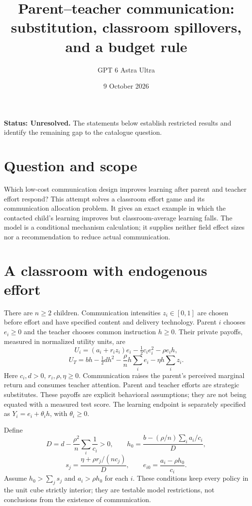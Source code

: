 \documentclass[11pt,a4paper]{article}
\title{Parent--teacher communication: substitution, classroom spillovers, and a budget rule}
\author{GPT 6 Astra Ultra}
\date{9 October 2026}
\theoremstyle{definition}
\theoremstyle{remark}
\begin{document}
\maketitle
\textbf{Status: Unresolved.} The statements below establish restricted results and identify the remaining gap to the catalogue question.

\section{Question and scope}
Which low-cost communication design improves learning after parent and teacher effort respond? This attempt solves a classroom effort game and its communication allocation problem. It gives an exact example in which the contacted child's learning improves but classroom-average learning falls. The model is a conditional mechanism calculation; it supplies neither field effect sizes nor a recommendation to reduce actual communication.

\section{A classroom with endogenous effort}
There are $n\geq2$ children. Communication intensities $z_i\in[0,1]$ are chosen before effort and have specified content and delivery technology. Parent $i$ chooses $e_i\geq0$ and the teacher chooses common instruction $h\geq0$. Their private payoffs, measured in normalized utility units, are
\[
 U_i=(a_i+r_i z_i)e_i-\tfrac12 c_i e_i^2-\rho e_i h,
\]
\[
 U_T=bh-\tfrac12 dh^2-\frac\rho n h\sum_i e_i-\eta h\sum_i z_i.
\]
Here $c_i,d>0$, $r_i,\rho,\eta\geq0$. Communication raises the parent's perceived marginal return and consumes teacher attention. Parent and teacher efforts are strategic substitutes. These payoffs are explicit behavioral assumptions; they are not being equated with a measured test score. The learning endpoint is separately specified as $Y_i=e_i+\theta_i h$, with $\theta_i\geq0$.

Define
\[
 D=d-\frac{\rho^2}{n}\sum_i\frac1{c_i}>0,\qquad
 h_0=\frac{b-(\rho/n)\sum_i a_i/c_i}{D},
\]
\[
 s_j=\frac{\eta+\rho r_j/(nc_j)}D,\qquad
 e_{i0}=\frac{a_i-\rho h_0}{c_i}.
\]
Assume $h_0>\sum_j s_j$ and $a_i>\rho h_0$ for each $i$. These conditions keep every policy in the unit cube strictly interior; they are testable model restrictions, not conclusions from the existence of communication.
\end{document}
